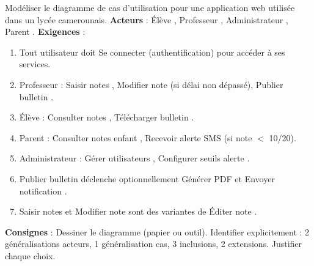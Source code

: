 \documentclass[11pt]{article}
\begin{document}
\begin{exercice}
Modéliser le diagramme de cas d'utilisation pour une application web utilisée dans un lycée camerounais.
\textbf{Acteurs} : \guillemotleft Élève \guillemotright, \guillemotleft Professeur \guillemotright, \guillemotleft Administrateur \guillemotright, \guillemotleft Parent \guillemotright.
\textbf{Exigences} :
\begin{enumerate}
    \item Tout utilisateur doit \guillemotleft Se connecter \guillemotright (authentification) pour accéder à ses services.
    \item \guillemotleft Professeur \guillemotright : \guillemotleft Saisir notes \guillemotright, \guillemotleft Modifier note \guillemotright (si délai non dépassé), \guillemotleft Publier bulletin \guillemotright.
    \item \guillemotleft Élève \guillemotright : \guillemotleft Consulter notes \guillemotright, \guillemotleft Télécharger bulletin \guillemotright.
    \item \guillemotleft Parent \guillemotright : \guillemotleft Consulter notes enfant \guillemotright, \guillemotleft Recevoir alerte SMS \guillemotright (si note $<$ 10/20).
    \item \guillemotleft Administrateur \guillemotright : \guillemotleft Gérer utilisateurs \guillemotright, \guillemotleft Configurer seuils alerte \guillemotright.
    \item \guillemotleft Publier bulletin \guillemotright déclenche optionnellement \guillemotleft Générer PDF \guillemotright et \guillemotleft Envoyer notification \guillemotright.
    \item \guillemotleft Saisir notes \guillemotright et \guillemotleft Modifier note \guillemotright sont des variantes de \guillemotleft Éditer note \guillemotright.
\end{enumerate}
\textbf{Consignes} : Dessiner le diagramme (papier ou outil). Identifier explicitement : 2 généralisations acteurs, 1 généralisation cas, 3 inclusions, 2 extensions. Justifier chaque choix.
\end{exercice}
\end{document}
